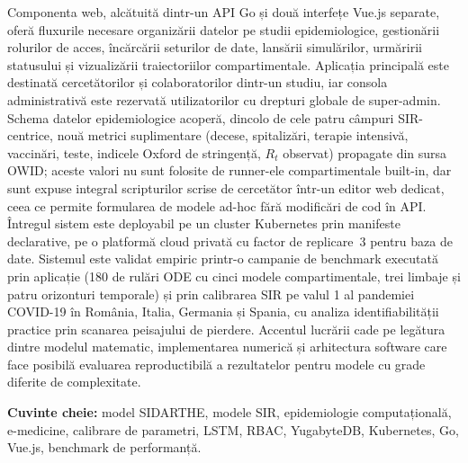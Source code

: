 Componenta web, alcătuită dintr-un API Go și două interfețe Vue.js separate,
oferă fluxurile necesare organizării datelor pe studii epidemiologice,
gestionării rolurilor de acces, încărcării seturilor de date, lansării
simulărilor, urmăririi statusului și vizualizării traiectoriilor
compartimentale. Aplicația principală este destinată cercetătorilor și
colaboratorilor dintr-un studiu, iar consola administrativă este rezervată
utilizatorilor cu drepturi globale de super-admin. Schema datelor
epidemiologice acoperă, dincolo de cele patru câmpuri SIR-centrice, nouă
metrici suplimentare (decese, spitalizări, terapie intensivă, vaccinări,
teste, indicele Oxford de stringență, $R_t$ observat) propagate din sursa
OWID; aceste valori nu sunt folosite de runner-ele compartimentale built-in,
dar sunt expuse integral scripturilor scrise de cercetător într-un editor
web dedicat, ceea ce permite formularea de modele ad-hoc fără modificări
de cod în API. Întregul sistem este
deployabil pe un cluster Kubernetes prin manifeste declarative, pe o platformă
cloud privată cu factor de replicare~3 pentru baza de date. Sistemul este validat empiric printr-o campanie de benchmark executată prin
aplicație (180 de rulări ODE cu cinci modele compartimentale, trei limbaje
și patru orizonturi temporale) și prin calibrarea SIR pe valul 1 al
pandemiei COVID-19 în România, Italia, Germania și Spania, cu analiza
identifiabilității practice prin scanarea peisajului de pierdere. Accentul
lucrării cade pe legătura dintre modelul matematic, implementarea numerică
și arhitectura software care face posibilă evaluarea reproductibilă a
rezultatelor pentru modele cu grade diferite de complexitate.

\bigskip
\noindent\textbf{Cuvinte cheie:} model SIDARTHE, modele SIR, epidemiologie computațională, e-medicine,
calibrare de parametri, LSTM, RBAC, YugabyteDB, Kubernetes, Go, Vue.js,
benchmark de performanță.
